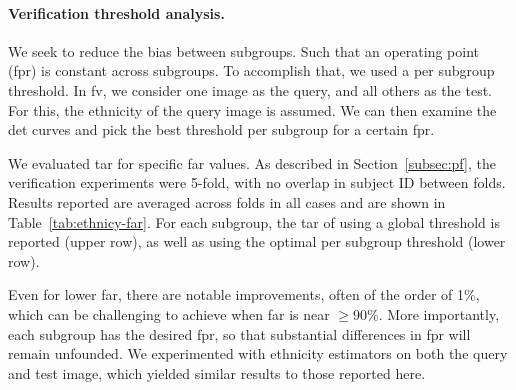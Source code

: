 \noindent\paragraph{Verification threshold analysis.}%
We seek to reduce the bias between subgroups. Such that an operating point (\ie \gls{fpr}) is constant across subgroups. To accomplish that, we used a per subgroup threshold. In \gls{fv}, we consider one image as the query, and all others as the test. For this, the ethnicity of the query image is assumed. We can then examine the \gls{det} curves and pick the best threshold per subgroup for a certain \gls{fpr}.

We evaluated \gls{tar} for specific \gls{far} values. As described in Section~\ref{subsec:pf}, the verification experiments were 5-fold, with no overlap in subject ID between folds. Results reported are averaged across folds in all cases and are shown in Table~\ref{tab:ethnicy-far}. For each subgroup, the \gls{tar} of using a global threshold is reported (upper row), as well as using the optimal per subgroup threshold (lower row). 

Even for lower \gls{far}, there are notable improvements, often of the order of 1\%, which can be challenging to achieve when \gls{far} is near $\geq$90\%. More importantly, each subgroup has the desired \gls{fpr}, so that substantial differences in \gls{fpr} will remain unfounded. We experimented with ethnicity estimators on both the query and test image, which yielded similar results to those reported here.

